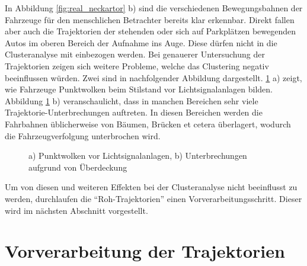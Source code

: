 In Abbildung \ref{fig:real_neckartor} b) sind die verschiedenen Bewegungsbahnen der Fahrzeuge für
den menschlichen Betrachter bereits klar erkennbar.
Direkt fallen aber auch die Trajektorien der stehenden oder sich auf Parkplätzen
bewegenden Autos im oberen Bereich der Aufnahme ins Auge. Diese dürfen nicht in die Clusteranalyse mit einbezogen werden.
Bei genauerer Untersuchung der Trajektorien zeigen sich weitere Probleme, welche das Clustering negativ
beeinflussen würden. Zwei sind in nachfolgender Abbildung dargestellt.
\ref{fig:real_defects_trajectories} a) zeigt, wie Fahrzeuge Punktwolken beim Stilstand vor Lichtsignalanlagen bilden.
Abbildung \ref{fig:real_defects_trajectories} b) veranschaulicht, dass in manchen Bereichen sehr viele Trajektorie-Unterbrechungen
auftreten. In diesen Bereichen werden die Fahrbahnen üblicherweise von Bäumen, Brücken et cetera überlagert, wodurch
die Fahrzeugverfolgung unterbrochen wird.

\begin{figure}[H]
    \centering
    \qquad
    \caption{a) Punktwolken vor Lichtsignalanlagen, b) Unterbrechungen aufgrund von Überdeckung}
    \label{fig:real_defects_trajectories}
\end{figure}

Um von diesen und weiteren Effekten bei der Clusteranalyse nicht beeinflusst zu werden, durchlaufen die
``Roh-Trajektorien'' einen Vorverarbeitungsschritt. Dieser wird im nächsten Abschnitt vorgestellt.

\section{Vorverarbeitung der Trajektorien}
\label{sec:realisation_preprocessing}

